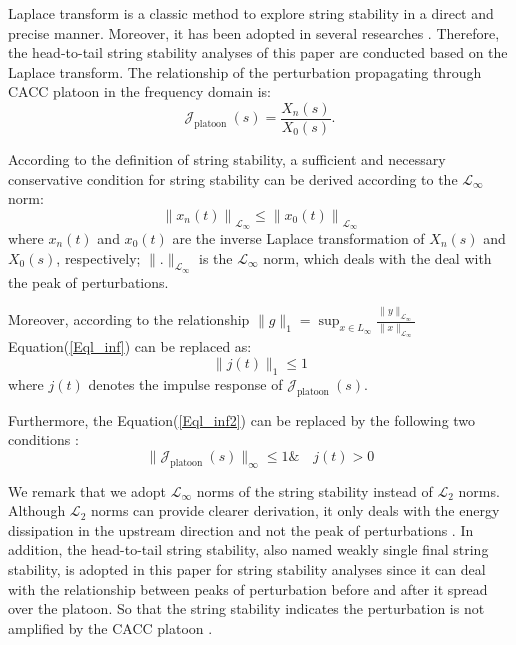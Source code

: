 \documentclass[a4paper,fleqn]{cas-sc}
\begin{document}
Laplace transform is a classic method to explore string stability in a direct and precise manner. Moreover, it has been adopted in several researches \citep{orosz2011delayed,montanino2021string,feng2019string}. Therefore, the head-to-tail string stability analyses of this paper are conducted based on the Laplace transform. The relationship of the perturbation propagating through CACC platoon in the frequency domain is:
\begin{equation}
  \mathcal{J}_{\text {platoon }}(s)=\frac{X_{n}(s)}{X_{0}(s)}.
\end{equation}

According to the definition of string stability, a sufficient and necessary conservative condition for string stability can be derived according to the $\mathcal{L}_{\infty}$ norm:
\begin{equation}
  \left\|x_{n}(t)\right\|_{\mathcal{L}_{\infty}} \leq \left\|x_{0}(t)\right\|_{\mathcal{L}_{\infty}}
  \label{Eql_inf}
\end{equation}
where $x_{n}(t)$ and $x_{0}(t)$ are the inverse Laplace transformation of $X_{n}(s)$ and $X_{0}(s)$, respectively; $\|.\|_{\mathcal{L}_{\infty}}$ is the $\mathcal{L}_{\infty}$ norm, which deals with the deal with the peak of perturbations.

Moreover, according to the relationship $\|g\|_{1}=\sup _{x \in L_{\infty}} \frac{\|y\|_{\mathcal{L}_{\infty}}}{\|x\|_{\mathcal{L}_{\infty}}}$ Equation(\ref{Eql_inf}) can be replaced as:
\begin{equation}
  \|j\left(t\right)\|_{1}\leq 1
  \label{Eql_inf2}
\end{equation}
where $j\left(t\right)$ denotes the impulse response of $\mathcal{J}_{\text {platoon }}(s)$.

Furthermore, the Equation(\ref{Eql_inf2}) can be replaced by the following two conditions \citep{Swaroop1994}:
\begin{equation}
  \|\mathcal{J}_{\text {platoon }}(s)\|_{\infty} \leq 1 \& \quad j\left(t\right)>0
  \label{Eql_inf3}
\end{equation}

We remark that we adopt $\mathcal{L}_{\infty}$ norms of the string stability instead of $\mathcal{L}_{2}$ norms. Although $\mathcal{L}_{2}$ norms can provide clearer derivation, it only deals with the energy dissipation in the upstream direction and not the peak of perturbations \citep{Darbha2003}. In addition, the head-to-tail string stability, also named weakly single final string stability, is adopted in this paper for string stability analyses since it can deal with the relationship between peaks of perturbation before and after it spread over the platoon. So that the string stability indicates the perturbation is not amplified by the CACC platoon \citep{Studli2017}.
\end{document}
